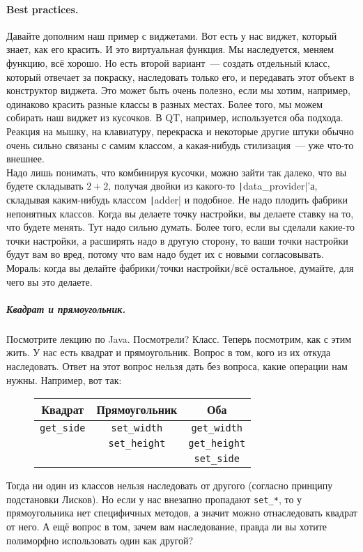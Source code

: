 \documentclass{article}
\begin{document}
    \paragraph{Best practices.}
    Давайте дополним наш пример с виджетами. Вот есть у нас виджет, который знает, как его красить. И это виртуальная функция. Мы наследуется, меняем функцию, всё хорошо. Но есть второй вариант~--- создать отдельный класс, который отвечает за покраску, наследовать только его, и передавать этот объект в конструктор виджета. Это может быть очень полезно, если мы хотим, например, одинаково красить разные классы в разных местах. Более того, мы можем собирать наш виджет из кусочков. В QT, например, используется оба подхода. Реакция на мышку, на клавиатуру, перекраска и некоторые другие штуки обычно очень сильно связаны с самим классом, а какая-нибудь стилизация~--- уже что-то внешнее.\\
    Надо лишь понимать, что комбинируя кусочки, можно зайти так далеко, что вы будете складывать $2+2$, получая двойки из какого-то \texttt|data_provider|'а, складывая каким-нибудь классом \texttt|adder| и подобное. Не надо плодить фабрики непонятных классов. Когда вы делаете точку настройки, вы делаете ставку на то, что будете менять. Тут надо сильно думать. Более того, если вы сделали какие-то точки настройки, а расширять надо в другую сторону, то ваши точки настройки будут вам во вред, потому что вам надо будет их с новыми согласовывать.\\
    Мораль: когда вы делайте фабрики/точки настройки/всё остальное, думайте, для чего вы это делаете.
    \subparagraph{Квадрат и прямоугольник.}
    Посмотрите лекцию по Java. Посмотрели? Класс. Теперь посмотрим, как с этим жить. У нас есть квадрат и прямоугольник. Вопрос в том, кого из их откуда наследовать. Ответ на этот вопрос нельзя дать без вопроса, какие операции нам нужны. Например, вот так:
    \begin{figure}[H]
        \begin{tabular}{|c|c|c|}
            \hline
            Квадрат & Прямоугольник & Оба\\
            \hline
            \Verb|get_side| & \Verb|set_width| & \Verb|get_width|\\
            & \Verb|set_height| & \Verb|get_height|\\
            && \Verb|set_side|\\
            \hline
        \end{tabular}
    \end{figure}
    Тогда ни один из классов нельзя наследовать от другого (согласно принципу подстановки Лисков). Но если у нас внезапно пропадают \Verb|set_*|, то у прямоугольника нет специфичных методов, а значит можно отнаследовать квадрат от него. А ещё вопрос в том, зачем вам наследование, правда ли вы хотите полиморфно использовать один как другой?
\end{document}
